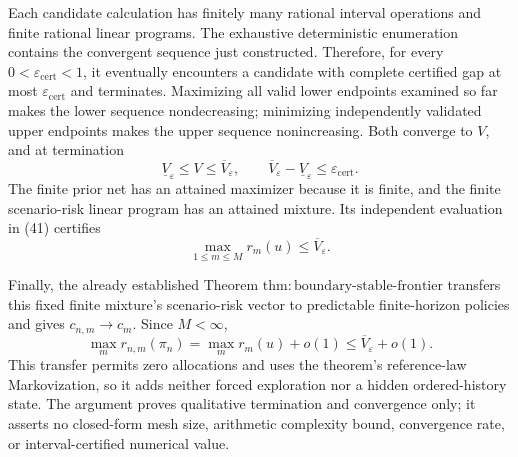 Each candidate calculation has finitely many rational interval operations and finite rational linear programs.  The exhaustive deterministic enumeration contains the convergent sequence just constructed.  Therefore, for every \(0<\varepsilon_{\mathrm{cert}}<1\), it eventually encounters a candidate with complete certified gap at most \(\varepsilon_{\mathrm{cert}}\) and terminates.  Maximizing all valid lower endpoints examined so far makes the lower sequence nondecreasing; minimizing independently validated upper endpoints makes the upper sequence nonincreasing.  Both converge to \(V\), and at termination
\[
 \underline V_{\varepsilon}\leq V\leq\overline V_{\varepsilon},
 \qquad
 \overline V_{\varepsilon}-\underline V_{\varepsilon}
 \leq\varepsilon_{\mathrm{cert}}.
 \tag{42}
\]
The finite prior net has an attained maximizer because it is finite, and the finite scenario-risk linear program has an attained mixture.  Its independent evaluation in (41) certifies
\[
 \max_{1\leq m\leq M}r_m(u)\leq\overline V_{\varepsilon}.
 \tag{43}
\]

Finally, the already established Theorem \(\mathrm{thm{:}boundary\text{-}stable\text{-}frontier}\) transfers this fixed finite mixture's scenario-risk vector to predictable finite-horizon policies and gives \(c_{n,m}\to c_m\).  Since \(M<\infty\),
\[
 \max_mr_{n,m}(\pi_n)=\max_mr_m(u)+o(1)
 \leq\overline V_{\varepsilon}+o(1).
 \tag{44}
\]
This transfer permits zero allocations and uses the theorem's reference-law Markovization, so it adds neither forced exploration nor a hidden ordered-history state.  The argument proves qualitative termination and convergence only; it asserts no closed-form mesh size, arithmetic complexity bound, convergence rate, or interval-certified numerical value.

